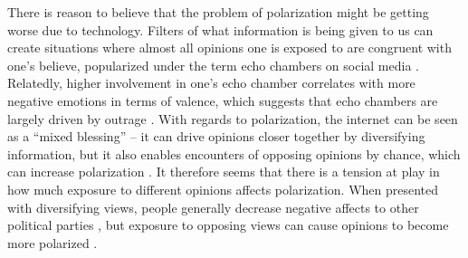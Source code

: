 \documentclass{article}
\begin{document}
There is reason to believe that the problem of polarization might be getting worse due to technology. Filters of what information is being given to us can create situations where almost all opinions one is exposed to are congruent with one’s believe, popularized under the term echo chambers on social media \cite{baumann_modeling_2020, sasahara_social_2021, tsai_echo_2020}. Relatedly, higher involvement in one’s echo chamber correlates with more negative emotions in terms of valence, which suggests that echo chambers are largely driven by outrage \cite{del_vicario_echo_2016}. With regards to polarization, the internet can be seen as a “mixed blessing” – it can drive opinions closer together by diversifying information, but it also enables encounters of opposing opinions by chance, which can increase polarization \cite{lev-on_happy_2009}. It therefore seems that there is a tension at play in how much exposure to different opinions affects polarization. When presented with diversifying views, people generally decrease negative affects to other political parties \cite{levy_social_2021}, but exposure to opposing views can cause opinions to become more polarized \cite{bail_exposure_2018}. 
\end{document}
